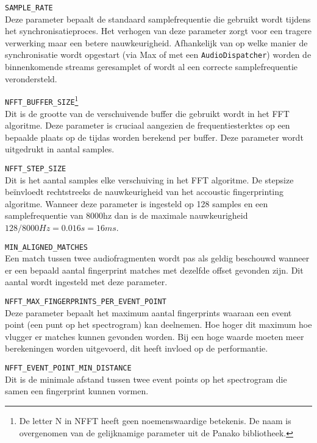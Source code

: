 \begin{description}
\item\texttt{SAMPLE\_RATE} \hfill \\
Deze parameter bepaalt de standaard samplefrequentie die gebruikt wordt tijdens het synchronisatieproces. Het verhogen van deze parameter zorgt voor een tragere verwerking maar een betere nauwkeurigheid. Afhankelijk van op welke manier de synchronisatie wordt opgestart (via Max of met een \texttt{AudioDispatcher}) worden de binnenkomende streams geresamplet of wordt al een correcte samplefrequentie verondersteld.

\item\texttt{NFFT\_BUFFER\_SIZE}\footnote{De letter N in NFFT heeft geen noemenswaardige betekenis. De naam is overgenomen van de gelijknamige parameter uit de Panako bibliotheek.} \hfill \\
Dit is de grootte van de verschuivende buffer die gebruikt wordt in het FFT algoritme. Deze parameter is cruciaal aangezien de frequentiesterktes op een bepaalde plaats op de tijd\-as worden berekend per buffer. Deze parameter wordt uitgedrukt in aantal samples.
\item\texttt{NFFT\_STEP\_SIZE} \hfill \\
Dit is het aantal samples elke verschuiving in het FFT algoritme. De stepsize beïnvloedt rechtstreeks de nauwkeurigheid van het accoustic fingerprinting algoritme. Wanneer deze parameter is ingesteld op 128 samples en een samplefrequentie van 8000hz dan is de maximale nauwkeurigheid $128/8000Hz = 0.016s = 16ms$.
\item\texttt{MIN\_ALIGNED\_MATCHES} \hfill \\
Een match tussen twee audiofragmenten wordt pas als geldig beschouwd wanneer er een bepaald aantal fingerprint matches met dezelfde offset gevonden zijn. Dit aantal wordt ingesteld met deze parameter.
\item\texttt{NFFT\_MAX\_FINGERPRINTS\_PER\_EVENT\_POINT} \hfill \\
Deze parameter bepaalt het maximum aantal fingerprints waaraan een event point (een punt op het spectrogram) kan deelnemen. Hoe hoger dit maximum hoe vlugger er matches kunnen gevonden worden. Bij een hoge waarde moeten meer berekeningen worden uitgevoerd, dit heeft invloed op de performantie.
\item\texttt{NFFT\_EVENT\_POINT\_MIN\_DISTANCE} \hfill \\
Dit is de minimale afstand tussen twee event points op het spectrogram die samen een fingerprint kunnen vormen. 

\end{description}

